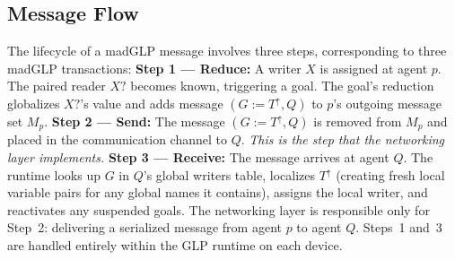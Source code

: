 \subsection{Message Flow}
\label{sec:msg-flow}
The lifecycle of a madGLP message involves three steps, corresponding to three madGLP transactions:
\textbf{Step 1 --- Reduce:} A writer $X$ is assigned at agent $p$. The paired reader $X?$ becomes known, triggering a  goal. The goal's reduction globalizes $X?$'s value and adds message $(G := T^\uparrow, Q)$ to $p$'s outgoing message set $M_p$.
\textbf{Step 2 --- Send:} The message $(G := T^\uparrow, Q)$ is removed from $M_p$ and placed in the communication channel to $Q$. \emph{This is the step that the networking layer implements.}
\textbf{Step 3 --- Receive:} The message arrives at agent $Q$. The runtime looks up $G$ in $Q$'s global writers table, localizes $T^\uparrow$ (creating fresh local variable pairs for any global names it contains), assigns the local writer, and reactivates any suspended goals.
The networking layer is responsible only for Step~2: delivering a serialized message from agent $p$ to agent $Q$. Steps~1 and~3 are handled entirely within the GLP runtime on each device.
